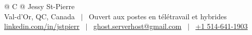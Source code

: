 
\begin{tabularx}{\linewidth}{@{} C @{}}
\huge{Jessy St-Pierre} \\[2pt]
Val-d'Or, QC, Canada \ $|$ \ Ouvert aux postes en télétravail et hybrides \\
\href{https://www.linkedin.com/in/jstpierr/}{linkedin.com/in/jstpierr} \ $|$ \
\href{mailto:ghost.serverhost@gmail.com}{ghost.serverhost@gmail.com} \ $|$ \
\href{tel:+15146411903}{+1 514-641-1903} \\
\end{tabularx}

\vspace{0.5em}
